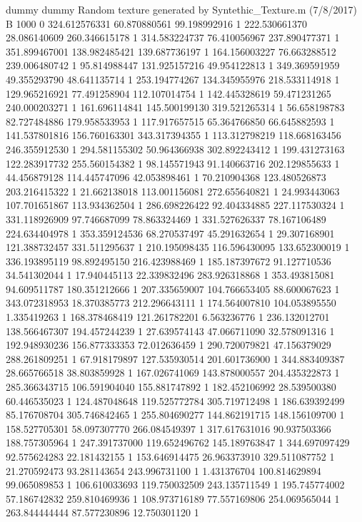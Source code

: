 dummy
dummy
Random texture generated by Syntethic_Texture.m (7/8/2017)
B	1000	0
324.612576331	60.870880561	99.198992916	1
222.530661370	28.086140609	260.346615178	1
314.583224737	76.410056967	237.890477371	1
351.899467001	138.982485421	139.687736197	1
164.156003227	76.663288512	239.006480742	1
95.814988447	131.925157216	49.954122813	1
349.369591959	49.355293790	48.641135714	1
253.194774267	134.345955976	218.533114918	1
129.965216921	77.491258904	112.107014754	1
142.445328619	59.471231265	240.000203271	1
161.696114841	145.500199130	319.521265314	1
56.658198783	82.727484886	179.958533953	1
117.917657515	65.364766850	66.645882593	1
141.537801816	156.760163301	343.317394355	1
113.312798219	118.668163456	246.355912530	1
294.581155302	50.964366938	302.892243412	1
199.431273163	122.283917732	255.560154382	1
98.145571943	91.140663716	202.129855633	1
44.456879128	114.445747096	42.053898461	1
70.210904368	123.480526873	203.216415322	1
21.662138018	113.001156081	272.655640821	1
24.993443063	107.701651867	113.934362504	1
286.698226422	92.404334885	227.117530324	1
331.118926909	97.746687099	78.863324469	1
331.527626337	78.167106489	224.634404978	1
353.359124536	68.270537497	45.291632654	1
29.307168901	121.388732457	331.511295637	1
210.195098435	116.596430095	133.652300019	1
336.193895119	98.892495150	216.423988469	1
185.187397672	91.127710536	34.541302044	1
17.940445113	22.339832496	283.926318868	1
353.493815081	94.609511787	180.351212666	1
207.335659007	104.766653405	88.600067623	1
343.072318953	18.370385773	212.296643111	1
174.564007810	104.053895550	1.335419263	1
168.378468419	121.261782201	6.563236776	1
236.132012701	138.566467307	194.457244239	1
27.639574143	47.066711090	32.578091316	1
192.948930236	156.877333353	72.012636459	1
290.720079821	47.156379029	288.261809251	1
67.918179897	127.535930514	201.601736900	1
344.883409387	28.665766518	38.803859928	1
167.026741069	143.878000557	204.435322873	1
285.366343715	106.591904040	155.881747892	1
182.452106992	28.539500380	60.446535023	1
124.487048648	119.525772784	305.719712498	1
186.639392499	85.176708704	305.746842465	1
255.804690277	144.862191715	148.156109700	1
158.527705301	58.097307770	266.084549397	1
317.617631016	90.937503366	188.757305964	1
247.391737000	119.652496762	145.189763847	1
344.697097429	92.575624283	22.181432155	1
153.646914475	26.963373910	329.511087752	1
21.270592473	93.281143654	243.996731100	1
1.431376704	100.814629894	99.065089853	1
106.610033693	119.750032509	243.135711549	1
195.745774002	57.186742832	259.810469936	1
108.973716189	77.557169806	254.069565044	1
263.844444444	87.577230896	12.750301120	1
